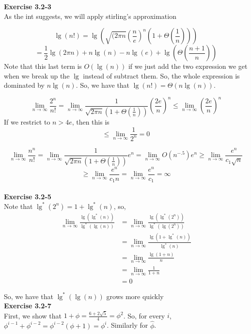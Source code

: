 \documentclass{article}
\begin{document}
\noindent\textbf{Exercise 3.2-3}\\

As the int suggests, we will apply stirling's approximation

\[
\lg(n!) = \lg\left(\sqrt{(2\pi n}\left(\frac{n}{e}\right)^n\left( 1 + \Theta\left(\frac{1}{n}\right)\right)\right) \]\[= \frac{1}{2}\lg(2\pi n) + n\lg(n) - n \lg (e) + \lg\left(\Theta\left(\frac{n+1}{n}\right)\right)
\]
Note that this last term is $O(\lg(n))$ if we just add the two expression we get when we break up the $\lg$ instead of subtract them. So, the whole expression is dominated by $n\lg(n)$. So, we have that $\lg(n!) = \Theta(n\lg(n))$.

\[
\lim_{n\rightarrow\infty} \frac{2^n}{n!} = \lim_{n\rightarrow\infty} \frac{1}{\sqrt{2\pi n}(1+\Theta(\frac{1}{n}))} \left(\frac{2e}{n}\right)^n \le  \lim_{n\rightarrow\infty} \left(\frac{2e}{n}\right)^n
\]
If we restrict to $n> 4e$, then this is 
\[
\le \lim_{n\rightarrow\infty} \frac{1}{2^n} = 0
\]

\[
\lim_{n\rightarrow\infty} \frac{n^n}{n!} = \lim_{n\rightarrow\infty} \frac{1}{\sqrt{2\pi n}(1+\Theta(\frac{1}{n}))}e^n =  \lim_{n\rightarrow\infty} O(n^{-.5})e^n \ge \lim_{n\rightarrow\infty} \frac{e^n}{c_1\sqrt{n}}\]\[ \ge\lim_{n\rightarrow\infty} \frac{e^n}{c_1n} =  \lim_{n\rightarrow\infty} \frac{e^n}{c_1} = \infty
\]\\

\noindent\textbf{Exercise 3.2-5}\\

Note that $\lg^*(2^n) = 1+ \lg^*(n)$, so, 
\begin{align*}
\lim_{n\rightarrow \infty} \frac{\lg(\lg^*(n))}{\lg^*(\lg(n))}&= \lim_{n\rightarrow \infty} \frac{\lg(\lg^*(2^n))}{\lg^*(\lg(2^n))}\\
& = \lim_{n\rightarrow \infty} \frac{\lg(1+\lg^*(n))}{\lg^*(n)} \\
&= \lim_{n\rightarrow \infty} \frac{\lg(1+n)}{n} \\
&= \lim_{n\rightarrow \infty} \frac{1}{1+n} \\
&= 0
\end{align*}

So, we have that $\lg^*(\lg(n))$ grows more quickly\\

\noindent\textbf{Exercise 3.2-7}\\

First, we show that $1+\phi = \frac{6+2\sqrt{5}}{4} = \phi^2$. So, for every $i$, $\phi^{i-1}+ \phi^{i-2} = \phi^{i-2}(\phi+1) = \phi^i$. Similarly for $\hat\phi$.
\end{document}

